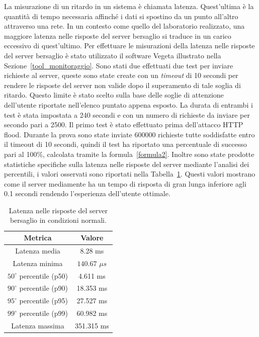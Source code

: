 La misurazione di un ritardo in un sistema è chiamata latenza. Quest'ultima è la quantità di tempo necessaria affinché i dati si spostino da un punto all'altro attraverso una rete. In un contesto come quello del laboratorio realizzato, una maggiore latenza nelle risposte del server bersaglio si traduce in un carico eccessivo di quest'ultimo. Per effettuare le misurazioni della latenza nelle risposte del server bersaglio è stato utilizzato il software Vegeta illustrato nella Sezione~\ref{tool_monitoraggio}. Sono stati due effettuati due test per inviare richieste al server, queste sono state create con un \emph{timeout} di 10 secondi per rendere le risposte del server non valide dopo il superamento di tale soglia di ritardo. Questo limite è stato scelto sulla base delle soglie di attenzione dell'utente riportate nell'elenco puntato appena esposto. La durata di entrambi i test è stata impostata a 240 secondi e con un numero di richieste da inviare per secondo pari a 2500. Il primo test è stato effettuato prima dell'attacco HTTP flood. Durante la prova sono state inviate 600000 richieste tutte soddisfatte entro il timeout di 10 secondi, quindi il test ha riportato una percentuale di successo pari al 100\%, calcolata tramite la formula~\ref{formula2}. Inoltre sono state prodotte statistiche specifiche sulla latenza nelle risposte del server mediante l’analisi dei percentili, i valori osservati sono riportati nella Tabella~\ref{latenza_no_attacco}. Questi valori mostrano come il server mediamente ha un tempo di risposta di gran lunga inferiore agli 0.1 secondi rendendo l'esperienza dell'utente ottimale.
\begin{table}[H]
        \centering
        \begin{tabular}{c c}
        \hline
        \textbf{Metrica} & \textbf{Valore} \\
        \hline
        Latenza media & 8.28 ms \\
        Latenza minima & $ 140.67$ $\mu s$ \\
        $50^\circ$ percentile (p50) &  4.611 ms\\
        $90^\circ$ percentile (p90) & 18.353 ms \\
        $95^\circ$ percentile (p95) & 27.527 ms \\
        $99^\circ$ percentile (p99) & 60.982 ms \\
        Latenza massima  & 351.315 ms \\
        \hline
        \end{tabular}
        \caption{Latenza nelle risposte del server bersaglio in condizioni normali.}
        \label{latenza_no_attacco}
\end{table}
